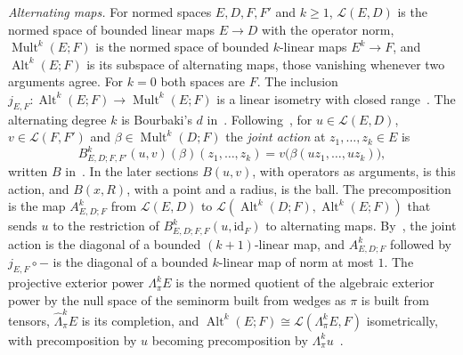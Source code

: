 \documentclass[11pt]{amsart}
\theoremstyle{definition}
\theoremstyle{remark}
\numberwithin{equation}{section}
\newcommand{\cL}{\mathcal L}
\newcommand{\Alt}{\operatorname{Alt}}
\newcommand{\Mult}{\operatorname{Mult}}
\newcommand{\id}{\mathrm{id}}
\theoremstyle{plain}
\theoremstyle{definition}
\theoremstyle{plain}
\begin{document}
\emph{Alternating maps.} For normed spaces $E,D,F,F'$ and $k\ge1$, $\cL(E,D)$ is the normed space of bounded linear maps $E\to D$ with the operator norm, $\Mult^k(E;F)$ is the normed space of bounded $k$-linear maps $E^k\to F$, and $\Alt^k(E;F)$ is its subspace of alternating maps, those vanishing whenever two arguments agree. For $k=0$ both spaces are $F$. The inclusion $j_{E,F}\colon\Alt^k(E;F)\to\Mult^k(E;F)$ is a linear isometry with closed range~\cite[Section~2]{I}. The alternating degree $k$ is Bourbaki's $d$ in~\cite[n\textsuperscript{o}~7.8]{Bou}. Following~\cite[Section~2]{I}, for $u\in\cL(E,D)$, $v\in\cL(F,F')$ and $\beta\in\Mult^k(D;F)$ the \emph{joint action} at $z_1,\dots,z_k\in E$ is
\[
 B^k_{E,D;F,F'}(u,v)(\beta)(z_1,\dots,z_k)=v\bigl(\beta(uz_1,\dots,uz_k)\bigr),
\]
written $B$ in~\cite{I}. In the later sections $B(u,v)$, with operators as arguments, is this action, and $B(x,R)$, with a point and a radius, is the ball. The precomposition is the map $A^k_{E,D;F}$ from $\cL(E,D)$ to $\cL(\Alt^k(D;F),\Alt^k(E;F))$ that sends $u$ to the restriction of $B^k_{E,D;F,F}(u,\id_F)$ to alternating maps. By~\cite[Proposition~2.2]{I}, the joint action is the diagonal of a bounded $(k+1)$-linear map, and $A^k_{E,D;F}$ followed by $j_{E,F}\circ{-}$ is the diagonal of a bounded $k$-linear map of norm at most $1$. The projective exterior power $\Lambda^k_\pi E$ is the normed quotient of the algebraic exterior power by the null space of the seminorm built from wedges as $\pi$ is built from tensors, $\widehat\Lambda^k_\pi E$ is its completion, and $\Alt^k(E;F)\cong\cL(\Lambda^k_\pi E,F)$ isometrically, with precomposition by $u$ becoming precomposition by $\Lambda^k_\pi u$~\cite[Section~3.1, Proposition~3.1]{I}.
\end{document}
